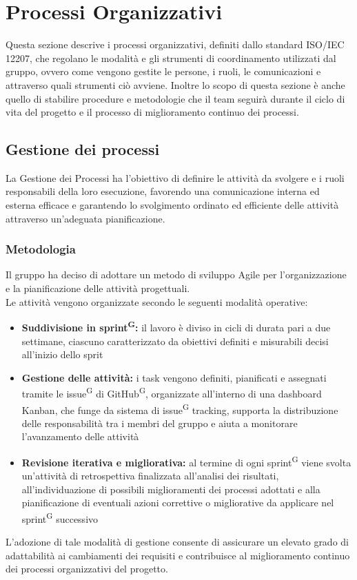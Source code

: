 \documentclass[a4paper, 11pt]{article}
\begin{document}
\section{Processi Organizzativi}
Questa sezione descrive i processi organizzativi, definiti dallo standard ISO/IEC 12207, che regolano le modalità e gli strumenti di coordinamento
utilizzati dal gruppo, ovvero come vengono gestite le persone, i ruoli, le comunicazioni e attraverso quali strumenti ciò avviene. Inoltre lo scopo
di questa sezione è anche quello di stabilire procedure e metodologie che il team seguirà durante il ciclo di vita del progetto e il processo di miglioramento continuo dei processi.

\subsection{Gestione dei processi}
La Gestione dei Processi ha l'obiettivo di definire le attività da svolgere e i ruoli responsabili della loro esecuzione, favorendo una comunicazione interna ed esterna efficace e garantendo lo svolgimento ordinato ed efficiente delle attività attraverso un'adeguata pianificazione.

\subsubsection{Metodologia}
Il gruppo ha deciso di adottare un metodo di sviluppo Agile per l'organizzazione e la pianificazione delle attività progettuali.\\
Le attività vengono organizzate secondo le seguenti modalità operative:
\begin{itemize}
    \item \textbf{Suddivisione in sprint\textsuperscript{G}:} il lavoro è diviso in cicli di durata pari a due settimane, ciascuno caratterizzato da obiettivi definiti e misurabili decisi all'inizio dello sprit
    \item \textbf{Gestione delle attività:} i task vengono definiti, pianificati e assegnati tramite le issue\textsuperscript{G} di GitHub\textsuperscript{G}, organizzate all'interno di una dashboard Kanban, che funge da sistema di issue\textsuperscript{G} tracking, supporta la distribuzione delle responsabilità tra i membri del gruppo e aiuta a monitorare l'avanzamento delle attività
    \item \textbf{Revisione iterativa e migliorativa:} al termine di ogni sprint\textsuperscript{G} viene svolta un'attività di retrospettiva finalizzata all'analisi dei risultati, all'individuazione di possibili miglioramenti dei processi adottati e alla pianificazione di eventuali azioni correttive o migliorative da applicare nel sprint\textsuperscript{G} successivo
\end{itemize}
L'adozione di tale modalità di gestione consente di assicurare un elevato grado di adattabilità ai cambiamenti dei requisiti e contribuisce al miglioramento continuo dei processi organizzativi del progetto.
\end{document}
